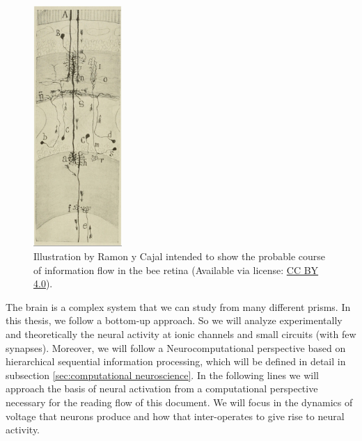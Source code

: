 \begin{figure}[htb!]
    \centering
    \includegraphics[width=0.3\textwidth]{img/intro/cajal-flow_small.jpg}
    \caption{Illustration by Ramon y Cajal intended to show the probable course of information flow in the bee retina \parencite{ramonycajal_sobre_1915} (Available via license: \href{https://creativecommons.org/licenses/by-sa/4.0/}{CC BY 4.0}).}
    \label{cajal-neuron}
\end{figure}


The brain is a complex system that we can study from many different prisms. In this thesis, we follow a bottom-up approach. So we will analyze experimentally and theoretically the neural activity at ionic channels and small circuits (with few synapses). Moreover, we will follow a Neurocomputational perspective based on hierarchical sequential information processing, which will be defined in detail in subsection \ref{sec:computational neuroscience}. In the following lines we will approach the basis of neural activation from a computational perspective necessary for the reading flow of this document. We will focus in the dynamics of voltage that neurons produce and how that inter-operates to give rise to neural activity. 

